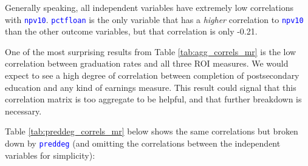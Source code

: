 \documentclass[12pt]{article}
\numberwithin{equation}{section}
\newcommand{\Varnm}[1]{\texttt{\textcolor{Blue}{#1}}}
\begin{document}
Generally speaking, all independent variables have extremely low correlations with \Varnm{npv10}. \Varnm{pctfloan} is the only variable that has a \textit{higher} correlation to \Varnm{npv10} than the other outcome variables, but that correlation is only -0.21. 

One of the most surprising results from Table \ref{tab:agg_correls_mr} is the low correlation between graduation rates and all three ROI measures. We would expect to see a high degree of correlation between completion of postsecondary education and any kind of earnings measure. This result could signal that this correlation matrix is too aggregate to be helpful, and that further breakdown is necessary.

Table \ref{tab:preddeg_correls_mr} below shows the same correlations but broken down by \Varnm{preddeg} (and omitting the correlations between the independent variables for simplicity):
\newpage

\end{document}
